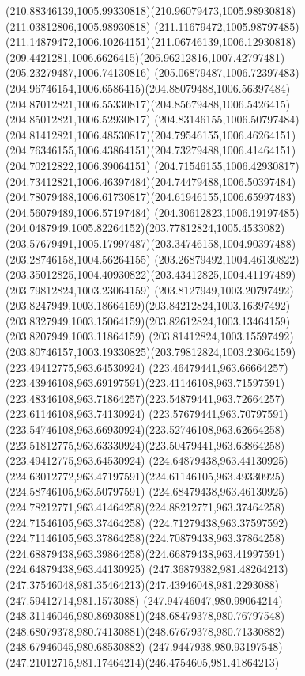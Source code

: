 {{\curveto(210.88346139,1005.99330818)(210.96079473,1005.98930818)(211.03812806,1005.98930818)
\curveto(211.11679472,1005.98797485)(211.14879472,1006.10264151)(211.06746139,1006.12930818)
\curveto(209.4421281,1006.6626415)(206.96212816,1007.42797481)(205.23279487,1006.74130816)
\curveto(205.06879487,1006.72397483)(204.96746154,1006.6586415)(204.88079488,1006.56397484)
\curveto(204.87012821,1006.55330817)(204.85679488,1006.5426415)(204.85012821,1006.52930817)
\curveto(204.83146155,1006.50797484)(204.81412821,1006.48530817)(204.79546155,1006.46264151)
\curveto(204.76346155,1006.43864151)(204.73279488,1006.41464151)(204.70212822,1006.39064151)
\curveto(204.71546155,1006.42930817)(204.73412821,1006.46397484)(204.74479488,1006.50397484)
\curveto(204.78079488,1006.61730817)(204.61946155,1006.65997483)(204.56079489,1006.57197484)
\curveto(204.30612823,1006.19197485)(204.0487949,1005.82264152)(203.77812824,1005.4533082)
\curveto(203.57679491,1005.17997487)(203.34746158,1004.90397488)(203.28746158,1004.56264155)
\curveto(203.26879492,1004.46130822)(203.35012825,1004.40930822)(203.43412825,1004.41197489)
\moveto(203.79812824,1003.23064159)
\curveto(203.8127949,1003.20797492)(203.8247949,1003.18664159)(203.84212824,1003.16397492)
\curveto(203.8327949,1003.15064159)(203.82612824,1003.13464159)(203.8207949,1003.11864159)
\curveto(203.81412824,1003.15597492)(203.80746157,1003.19330825)(203.79812824,1003.23064159)
\moveto(223.49412775,963.64530924)
\curveto(223.46479441,963.66664257)(223.43946108,963.69197591)(223.41146108,963.71597591)
\curveto(223.48346108,963.71864257)(223.54879441,963.72664257)(223.61146108,963.74130924)
\curveto(223.57679441,963.70797591)(223.54746108,963.66930924)(223.52746108,963.62664258)
\curveto(223.51812775,963.63330924)(223.50479441,963.63864258)(223.49412775,963.64530924)
\moveto(224.64879438,963.44130925)
\curveto(224.63012772,963.47197591)(224.61146105,963.49330925)(224.58746105,963.50797591)
\curveto(224.68479438,963.46130925)(224.78212771,963.41464258)(224.88212771,963.37464258)
\lineto(224.71546105,963.37464258)
\curveto(224.71279438,963.37597592)(224.71146105,963.37864258)(224.70879438,963.37864258)
\curveto(224.68879438,963.39864258)(224.66879438,963.41997591)(224.64879438,963.44130925)
\moveto(247.36879382,981.48264213)
\curveto(247.37546048,981.35464213)(247.43946048,981.2293088)(247.59412714,981.1573088)
\curveto(247.94746047,980.99064214)(248.31146046,980.86930881)(248.68479378,980.76797548)
\curveto(248.68079378,980.74130881)(248.67679378,980.71330882)(248.67946045,980.68530882)
\curveto(247.9447938,980.93197548)(247.21012715,981.17464214)(246.4754605,981.41864213)
}}
